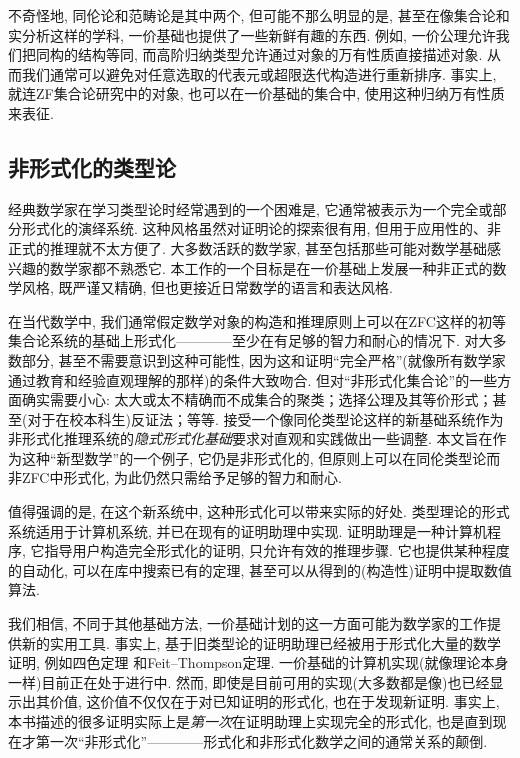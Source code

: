 不奇怪地, 同伦论和范畴论是其中两个, 但可能不那么明显的是, 甚至在像集合论和实分析这样的学科, 一价基础也提供了一些新鲜有趣的东西. 
例如, 一价公理允许我们把同构的结构等同, 而高阶归纳类型允许通过对象的万有性质直接描述对象. 
从而我们通常可以避免对任意选取的代表元或超限迭代构造进行重新排序. 
事实上, 就连ZF集合论研究中的对象, 也可以在一价基础的集合中, 使用这种归纳万有性质来表征. 

%


\subsection*{非形式化的类型论}

%
%
%
%
经典数学家在学习类型论时经常遇到的一个困难是, 它通常被表示为一个完全或部分形式化的演绎系统. 
这种风格虽然对证明论的探索很有用, 但用于应用性的、非正式的推理就不太方便了. 
大多数活跃的数学家, 甚至包括那些可能对数学基础感兴趣的数学家都不熟悉它. 
本工作的一个目标是在一价基础上发展一种非正式的数学风格, 既严谨又精确, 但也更接近日常数学的语言和表达风格. 

在当代数学中, 我们通常假定数学对象的构造和推理原则上可以在ZFC这样的初等集合论系统的基础上形式化————至少在有足够的智力和耐心的情况下. 
对大多数部分, 甚至不需要意识到这种可能性, 因为这和证明``完全严格''(就像所有数学家通过教育和经验直观理解的那样)的条件大致吻合. 
但对``非形式化集合论''的一些方面确实需要小心: 太大或太不精确而不成集合的聚类；选择公理及其等价形式；甚至(对于在校本科生)反证法；等等. 
接受一个像同伦类型论这样的新基础系统作为非形式化推理系统的\emph{隐式形式化基础}要求对直观和实践做出一些调整. 
本文旨在作为这种``新型数学''的一个例子, 它仍是非形式化的, 但原则上可以在同伦类型论而非ZFC中形式化, 为此仍然只需给予足够的智力和耐心. 

值得强调的是, 在这个新系统中, 这种形式化可以带来实际的好处. 
类型理论的形式系统适用于计算机系统, 并已在现有的证明助理中实现. 
%
证明助理是一种计算机程序, 它指导用户构造完全形式化的证明, 只允许有效的推理步骤. 
它也提供某种程度的自动化, 可以在库中搜索已有的定理, 甚至可以从得到的(构造性)证明中提取数值算法. 

我们相信, 不同于其他基础方法, 一价基础计划的这一方面可能为数学家的工作提供新的实用工具. 
事实上, 基于旧类型论的证明助理已经被用于形式化大量的数学证明, 例如四色定理 和Feit--Thompson定理. 
一价基础的计算机实现(就像理论本身一样)目前正在处于进行中. 
%
然而, 即使是目前可用的实现(大多数都是像)也已经显示出其价值, 这价值不仅仅在于对已知证明的形式化, 也在于发现新证明. 
事实上, 本书描述的很多证明实际上是\emph{第一次}在证明助理上实现完全的形式化, 也是直到现在才第一次``非形式化''————形式化和非形式化数学之间的通常关系的颠倒. 

